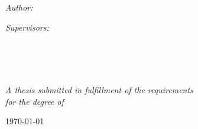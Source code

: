 \begin{titlepage}
    \begin{center}
    
    \vspace*{.06\textheight}
    {\scshape\LARGE \univname\par}\vspace{1.5cm} %
    
    {\huge \bfseries \ttitle\par}\vspace{2.4cm} %
     
    \begin{minipage}[t]{0.4\textwidth}
    \begin{flushleft} \large
    \emph{Author:}\\
    \authorname %
    \end{flushleft}
    \end{minipage}
    \begin{minipage}[t]{0.4\textwidth}
    \begin{flushright} \large
    \emph{Supervisors:} \\
    \supname \\%
    \examname \\
    \end{flushright}
    \end{minipage}\\[3cm]
     
    \vfill
    
    \large \textit{A thesis submitted in fulfillment of the requirements\\ for the degree of \degreename}\\[0.3cm] %
     
    \vfill
    
    {\large \today}\\[4cm] %
     
    \vfill
    \end{center}
    \end{titlepage}